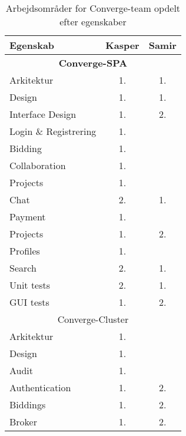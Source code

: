 \begin{table}[H]
  \centering
  \caption{Arbejdsområder for Converge-team opdelt efter egenskaber}
  \label{tab:distribution-of-work}
  \begin{tabular}{lcc}
    \hline
    \textbf{Egenskab}      & \textbf{Kasper} & \textbf{Samir} \\ \hline
    \multicolumn{3}{c}{\textbf{Converge-SPA}}                 \\ \hline
    Arkitektur             & 1.              & 1.             \\
    Design                 & 1.              & 1.             \\
    Interface Design       & 1.              & 2.             \\
    Login \& Registrering  & 1.              &                \\
    Bidding                & 1.              &                \\
    Collaboration          & 1.              &                \\
    Projects               & 1.              &                \\
    Chat                   & 2.              & 1.             \\
    Payment                & 1.              &                \\
    Projects               & 1.              & 2.             \\
    Profiles               & 1.              &                \\
    Search                 & 2.              & 1.             \\
    Unit tests             & 2.              & 1.             \\
    GUI tests              & 1.              & 2.             \\ \hline
    \multicolumn{3}{c}{Converge-Cluster}                      \\ \hline
    Arkitektur             & 1.              &                \\
    Design                 & 1.              &                \\
    Audit                  & 1.              &                \\
    Authentication         & 1.              & 2.             \\
    Biddings               & 1.              & 2.             \\
    Broker                 & 1.              & 2.             \\

\end{tabular}
\end{table}
